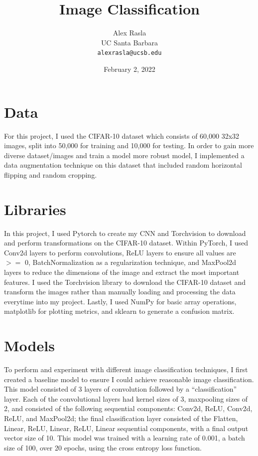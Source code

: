\documentclass[11pt,a4paper]{article}
\title{Image Classification}
\author{Alex Rasla \\
  UC Santa Barbara \\
  \texttt{alexrasla@ucsb.edu}}
\date{February 2, 2022}
\begin{document}
\maketitle

\section{Data}

For this project, I used the CIFAR-10 \cite{Krizhevsky09learningmultiple} dataset which consists of 60,000 32x32 images, 
 split into 50,000 for training and 10,000 for testing. In order to gain more diverse dataset/images
  and train a model more robust model, I implemented a data augmentation technique on this dataset that
  included random horizontal flipping and random cropping.

\section{Libraries}

In this project, I used Pytorch to create my CNN and Torchvision to download and perform transformations on the CIFAR-10 dataset.
 Within PyTorch, I used Conv2d layers to perform convolutions, ReLU layers to ensure all values are $>=$ 0, BatchNormalization as a 
 regularization technique, and MaxPool2d layers to reduce the dimensions of the image and extract the most important features. I used the 
 Torchvision library to download the CIFAR-10 dataset and transform the images rather than manually loading and 
 processing the data everytime into my project. Lastly, I used NumPy for basic array operations, matplotlib for
  plotting metrics, and sklearn to generate a confusion matrix.


\section{Models}
To perform and experiment with different image classification techniques, I first created a baseline model to ensure I could 
achieve reasonable image classification. This model consisted of 3 layers of convolution followed by a “classification” layer. 
Each of the convolutional layers had kernel sizes of 3, maxpooling sizes of 2, and consisted of the following sequential components: 
Conv2d, ReLU, Conv2d, ReLU, and MaxPool2d; the final classification layer consisted of the Flatten, Linear, ReLU, Linear, ReLU, 
Linear sequential components, with a final output vector size of 10. This model was trained with a learning rate of 0.001, a batch size of 100, 
over 20 epochs, using the cross entropy loss function.
\end{document}
